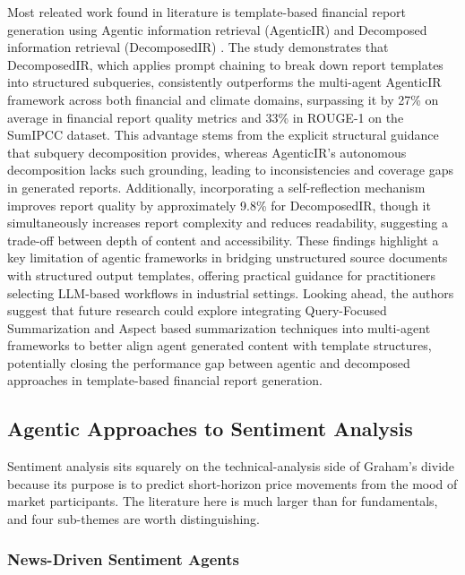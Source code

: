 Most releated work found in literature is template-based financial report generation using Agentic information retrieval (AgenticIR) and Decomposed information retrieval (DecomposedIR) \citet{tian2025templatebased}. The study demonstrates that DecomposedIR, which applies prompt chaining to break down report templates into structured subqueries, consistently outperforms the multi-agent AgenticIR framework across both financial and climate domains, surpassing it by 27\% on average in financial report quality metrics and 33\% in ROUGE-1 on the SumIPCC dataset. This advantage stems from the explicit structural guidance that subquery decomposition provides, whereas AgenticIR's autonomous decomposition lacks such grounding, leading to inconsistencies and coverage gaps in generated reports. Additionally, incorporating a self-reflection mechanism improves report quality by approximately 9.8\% for DecomposedIR, though it simultaneously increases report complexity and reduces readability, suggesting a trade-off between depth of content and accessibility. These findings highlight a key limitation of agentic frameworks in bridging unstructured source documents with structured output templates, offering practical guidance for practitioners selecting LLM-based workflows in industrial settings. Looking ahead, the authors suggest that future research could explore integrating Query-Focused Summarization and Aspect based summarization techniques into multi-agent frameworks to better align agent generated content with template structures, potentially closing the performance gap between agentic and decomposed approaches in template-based financial report generation.

\subsection{Agentic Approaches to Sentiment Analysis}
\label{sec:sentimentagents}

Sentiment analysis sits squarely on the technical-analysis side of
Graham's divide because its purpose is to predict short-horizon
price movements from the mood of market participants. The literature
here is much larger than for fundamentals, and four sub-themes are
worth distinguishing.

\subsubsection{News-Driven Sentiment Agents}
\label{sec:newssentiment}

